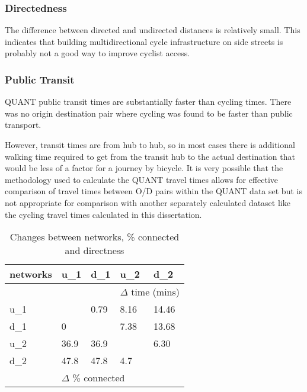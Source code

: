 \subsubsection{Directedness}

The difference between directed and undirected distances is relatively small. This indicates that building multidirectional cycle infrastructure on side streets is probably not a good way to improve cyclist access.  


\subsubsection{Public Transit}

QUANT public transit times are substantially faster than cycling times. There was no origin destination pair where cycling was found to be faster than public transport. 

However, transit times are from hub to hub, so in most cases there is additional walking time required to get from the transit hub to the actual destination that would be less of a factor for a journey by bicycle. It is very possible that the methodology used to calculate the QUANT travel times allows for effective comparison of travel times between O/D pairs within the QUANT data set but is not appropriate for comparison with another separately calculated dataset like the cycling travel times calculated in this dissertation. 

\begin{table}
\centering
\begin{tabular}{@{}lllll@{}}
\toprule
networks & u\_1   & d\_1  & u\_2            & d\_2          \\ \midrule
         &        &       & \multicolumn{2}{l}{$\Delta$ time (mins)}  \\
u\_1     &       &  0.79 & 8.16            & 14.46         \\
d\_1     & 0      &      & 7.38            & 13.68         \\
u\_2     & 36.9   & 36.9  &                & 6.30          \\
d\_2     & 47.8   & 47.8  & 4.7             &              \\
         & \multicolumn{3}{l}{$\Delta$ \% connected} &               \\ \bottomrule
\end{tabular}
\caption{Changes between networks, \% connected and directness}
\label{table:change between nets}
\end{table}


